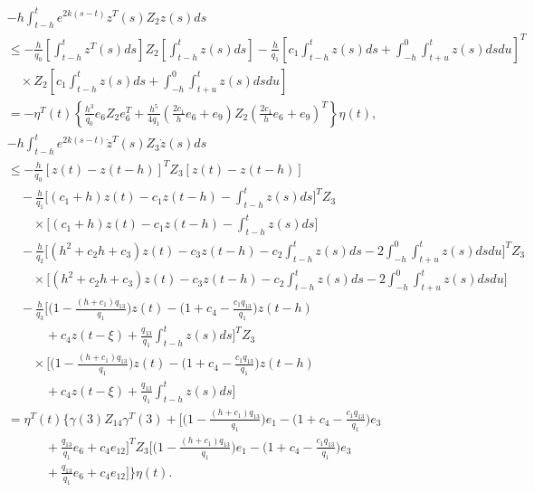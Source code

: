 \documentclass[a4paper, 12pt, oneside]{article}
\theoremstyle{cn_theorem}
\begin{document}
\begin{align*}
    & -h \int_{t-h}^t e^{2k(s-t)} z^T(s) Z_2 z(s) ds \\
    & \le -\frac{h}{q_0} \left[\int_{t-h}^t z^T(s)ds\right] Z_2 \left[\int_{t-h}^t z(s)ds\right] - \frac{h}{q_1} \left[ c_1 \int_{t-h}^t z(s)ds + \int_{-h}^0 \int_{t+u}^t z(s)ds du \right]^T \\
    & \quad \times Z_2 \left[ c_1 \int_{t-h}^t z(s)ds + \int_{-h}^0 \int_{t+u}^t z(s)ds du \right] \\
    & = -\eta^T(t) \left\{ \frac{h^3}{q_0} e_6 Z_2 e_6^T + \frac{h^5}{4q_1} \left( \frac{2c_1}{h} e_6 + e_9 \right) Z_2 \left( \frac{2c_1}{h} e_6 + e_9 \right)^T \right\} \eta(t), \\[1.5em]
    & -h \int_{t-h}^t e^{2k(s-t)} \dot{z}^T(s) Z_3 \dot{z}(s) ds \\
    & \le -\frac{h}{q_0}[z(t)-z(t-h)]^T Z_3 [z(t)-z(t-h)] \\
    & \quad - \frac{h}{q_1}\bigg[ (c_1+h)z(t) - c_1 z(t-h) - \int_{t-h}^t z(s)ds \bigg]^T Z_3 \nonumber \\
    & \quad \quad \times \bigg[ (c_1+h)z(t) - c_1 z(t-h) - \int_{t-h}^t z(s)ds \bigg] \\
    & \quad - \frac{h}{q_2}\bigg[ (h^2+c_2h+c_3)z(t) - c_3 z(t-h) - c_2 \int_{t-h}^t z(s)ds - 2\int_{-h}^0 \int_{t+u}^t z(s)ds du \bigg]^T Z_3 \nonumber \\
    & \quad \quad \times \bigg[ (h^2+c_2h+c_3)z(t) - c_3 z(t-h) - c_2 \int_{t-h}^t z(s)ds - 2\int_{-h}^0 \int_{t+u}^t z(s)ds du \bigg] \\
    & \quad - \frac{h}{q_3}\bigg[ \Big(1-\frac{(h+c_1)q_{13}}{q_1}\Big)z(t) - \Big(1+c_4-\frac{c_1 q_{13}}{q_1}\Big)z(t-h) \nonumber \\
    & \quad \quad \quad + c_4 z(t-\xi) + \frac{q_{13}}{q_1} \int_{t-h}^t z(s)ds \bigg]^T Z_3 \nonumber \\
    & \quad \quad \times \bigg[ \Big(1-\frac{(h+c_1)q_{13}}{q_1}\Big)z(t) - \Big(1+c_4-\frac{c_1 q_{13}}{q_1}\Big)z(t-h) \nonumber \\
    & \quad \quad \quad + c_4 z(t-\xi) + \frac{q_{13}}{q_1} \int_{t-h}^t z(s)ds \bigg] \\
    &= \eta^T(t) \Bigg\{ \gamma(3) Z_{14} \gamma^T(3) + \bigg[ \Big(1-\frac{(h+c_1)q_{13}}{q_1}\Big)e_1 - \Big(1+c_4-\frac{c_1 q_{13}}{q_1}\Big)e_3 \nonumber \\
    & \quad \quad \quad + \frac{q_{13}}{q_1}e_6 + c_4 e_{12} \bigg]^T Z_3 \bigg[ \Big(1-\frac{(h+c_1)q_{13}}{q_1}\Big)e_1 - \Big(1+c_4-\frac{c_1 q_{13}}{q_1}\Big)e_3 \nonumber \\
    & \quad \quad \quad + \frac{q_{13}}{q_1}e_6 + c_4 e_{12} \bigg] \Bigg\} \eta(t).
\end{align*}
\end{document}
